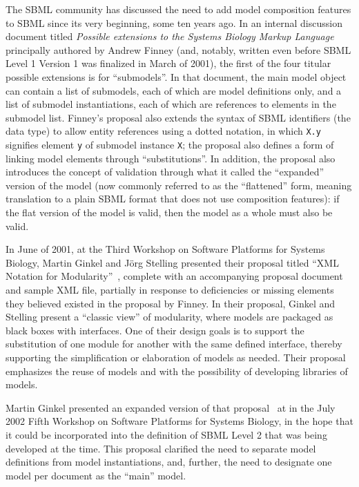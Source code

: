 The SBML community has discussed the need to add model composition
features to SBML since its very beginning, some ten years ago.  In an
internal discussion document titled \emph{Possible extensions to the
  Systems Biology Markup Language}~\cite{} principally authored by Andrew Finney
(and, notably, written even before SBML Level 1 Version 1 was finalized
in March of 2001), the first of the four titular possible extensions is
for ``submodels''. In that document, the main model object can contain a
list of submodels, each of which are model definitions only, and a list
of submodel instantiations, each of which are references to elements in
the submodel list.  Finney's proposal also extends the syntax of SBML
identifiers (the  data type) to allow entity references
using a dotted notation, in which \texttt{X.y} signifies element
\texttt{y} of submodel instance \texttt{X}; the proposal also defines a
form of linking model elements through ``substitutions''.  In addition,
the proposal also introduces the concept of validation through what it
called the ``expanded'' version of the model (now commonly referred to
as the ``flattened'' form, meaning translation to a plain SBML format
that does not use composition features): if the flat version of the
model is valid, then the model as a whole must also be valid.

In June of 2001, at the Third Workshop on Software Platforms for Systems
Biology, Martin Ginkel and J\"{o}rg Stelling presented their proposal
titled ``XML Notation for Modularity''~\cite{}, complete with an
accompanying proposal document and sample XML file, partially in
response to deficiencies or missing elements they believed existed in
the proposal by Finney.  In their proposal, Ginkel and Stelling present
a ``classic view'' of modularity, where models are packaged as black
boxes with interfaces.  One of their design goals is to support the
substitution of one module for another with the same defined interface,
thereby supporting the simplification or elaboration of models as
needed.  Their proposal emphasizes the reuse of models and with the
possibility of developing libraries of models.

Martin Ginkel presented an expanded version of that proposal~\cite{} at
in the July 2002 Fifth Workshop on Software Platforms for Systems
Biology, in the hope that it could be incorporated into the definition
of SBML Level 2 that was being developed at the time.  This proposal
clarified the need to separate model definitions from model
instantiations, and, further, the need to designate one model per
document as the ``main'' model.

